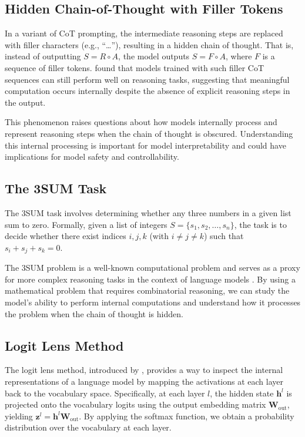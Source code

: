 \documentclass{article}
\begin{document}
\subsection{Hidden Chain-of-Thought with Filler Tokens}

In a variant of CoT prompting, the intermediate reasoning steps are replaced with filler characters (e.g., ``\ldots''), resulting in a hidden chain of thought. That is, instead of outputting $S = R \circ A$, the model outputs $S = F \circ A$, where $F$ is a sequence of filler tokens. \citet{pfau2023let} found that models trained with such filler CoT sequences can still perform well on reasoning tasks, suggesting that meaningful computation occurs internally despite the absence of explicit reasoning steps in the output.

This phenomenon raises questions about how models internally process and represent reasoning steps when the chain of thought is obscured. Understanding this internal processing is important for model interpretability and could have implications for model safety and controllability.

\subsection{The 3SUM Task}

The 3SUM task involves determining whether any three numbers in a given list sum to zero. Formally, given a list of integers $S = \{s_1, s_2, \dots, s_n\}$, the task is to decide whether there exist indices $i, j, k$ (with $i \ne j \ne k$) such that $s_i + s_j + s_k = 0$.

The 3SUM problem is a well-known computational problem and serves as a proxy for more complex reasoning tasks in the context of language models \cite{pfau2023let}. By using a mathematical problem that requires combinatorial reasoning, we can study the model's ability to perform internal computations and understand how it processes the problem when the chain of thought is hidden.

\subsection{Logit Lens Method}

The logit lens method, introduced by \citet{nostalgebraist2020}, provides a way to inspect the internal representations of a language model by mapping the activations at each layer back to the vocabulary space. Specifically, at each layer $l$, the hidden state $\mathbf{h}^l$ is projected onto the vocabulary logits using the output embedding matrix $\mathbf{W}_{\text{out}}$, yielding $\mathbf{z}^l = \mathbf{h}^l \mathbf{W}_{\text{out}}$. By applying the softmax function, we obtain a probability distribution over the vocabulary at each layer.
\end{document}
